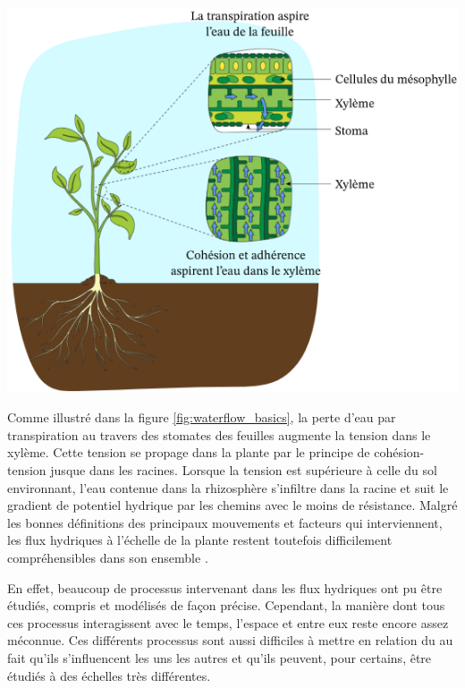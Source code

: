 \begin{minipage}{0.5\linewidth}
\captionsetup{type=figure,hypcap=true}
\centering
\includegraphics[width=\linewidth]{Image/waterflow_basics.png}
\label{fig:waterflow_basics}
\end{minipage}\hfill
\begin{minipage}{0.45\linewidth}
Comme illustré dans la figure \ref{fig:waterflow_basics}, la perte d'eau par transpiration au travers des stomates des feuilles augmente la tension dans le xylème. Cette tension se propage dans la plante par le principe de cohésion-tension jusque dans les racines.
Lorsque la tension est supérieure à celle du sol environnant, l'eau contenue dans la rhizosphère s'infiltre dans la racine et suit le gradient de potentiel hydrique par les chemins avec le moins de résistance.
Malgré les bonnes définitions des principaux mouvements et facteurs qui interviennent, les flux hydriques à l'échelle de la plante restent toutefois difficilement compréhensibles dans son ensemble \citep{lobet_plant_2014}.
\end{minipage} 
\newline

\noindent En effet, beaucoup de processus intervenant dans les flux hydriques ont pu être étudiés, compris et modélisés de façon précise.
Cependant, la manière dont tous ces processus interagissent avec le temps, l'espace et entre eux reste encore assez méconnue.
Ces différents processus sont aussi difficiles à mettre en relation du au fait qu'ils s'influencent les uns les autres et qu'ils peuvent, pour certains, être étudiés à des échelles très différentes.
\newline

